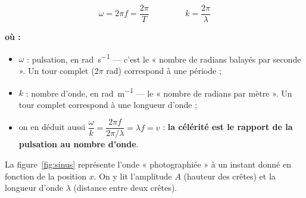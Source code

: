 \documentclass[11pt,a4paper]{article}
\newenvironment{ou}{%
  \par\smallskip\noindent\textbf{où :}\nopagebreak
  \begin{itemize}[leftmargin=1.8em,topsep=2pt,itemsep=1.5pt,parsep=0pt]}%
  {\end{itemize}}
\begin{document}
\begin{formule}
\[ \boxed{\,\omega = 2\pi f = \frac{2\pi}{T}\,}\qquad\qquad
   \boxed{\,k = \frac{2\pi}{\lambda}\,} \]
\begin{ou}
  \item $\omega$ : pulsation, en \si{\radian\per\second} — c'est le « nombre de radians
        balayés par seconde ». Un tour complet ($2\pi$ rad) correspond à une période ;
  \item $k$ : nombre d'onde, en \si{\radian\per\metre} — le « nombre de radians par mètre ».
        Un tour complet correspond à une longueur d'onde ;
  \item on en déduit aussi $\dfrac{\omega}{k} = \dfrac{2\pi f}{2\pi/\lambda} = \lambda f = v$ :
        \textbf{la célérité est le rapport de la pulsation au nombre d'onde}.
\end{ou}
\end{formule}

La figure~\ref{fig:sinus} représente l'onde « photographiée » à un instant donné en fonction
de la position $x$. On y lit l'amplitude $A$ (hauteur des crêtes) et la longueur d'onde
$\lambda$ (distance entre deux crêtes).
\end{document}
